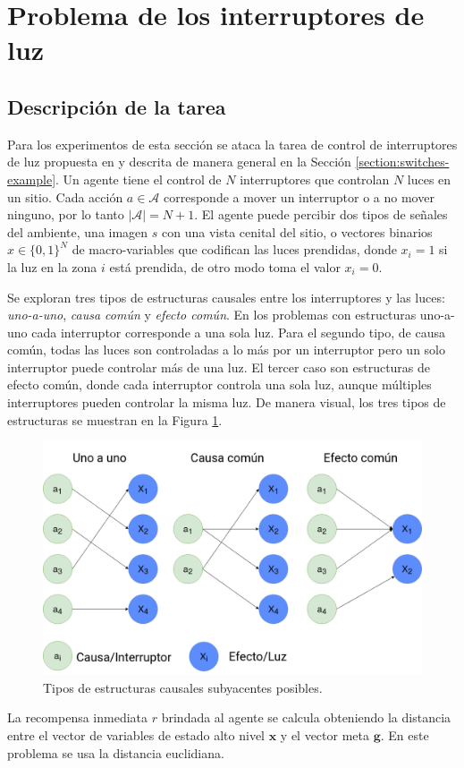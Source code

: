 \section{Problema de los interruptores de luz}

\subsection{Descripción de la tarea}
Para los experimentos de esta sección se ataca la tarea de control de interruptores de luz propuesta en \cite{nair2019causal} y descrita de manera general en la Sección \ref{section:switches-example}. Un agente tiene el control
de $N$ interruptores que controlan $N$ luces en un sitio.
Cada acción $a\in \mathcal{A}$ corresponde a mover un interruptor o 
a no mover ninguno, por lo tanto $|\mathcal{A}| = N + 1$.
El agente puede percibir dos tipos de señales del ambiente,
una imagen $s$ con una vista cenital del sitio, o vectores binarios $x \in \{0,1\}^N$ de 
macro-variables que codifican las luces prendidas, donde
$x_i = 1$ si la luz en la zona $i$ está prendida, de otro modo 
toma el valor $x_i = 0$.

Se exploran tres tipos de estructuras causales entre los
interruptores y las luces: \textit{uno-a-uno},
\textit{causa común} y \textit{efecto común}.
En los problemas con estructuras uno-a-uno cada interruptor corresponde a una sola luz.
Para el segundo tipo, de causa común, todas
las luces son controladas a lo más por un interruptor pero un
solo interruptor puede controlar más de una luz.
El tercer caso son estructuras de efecto común, donde cada interruptor
controla una sola luz, aunque múltiples interruptores
pueden controlar la misma luz. De manera visual, los tres tipos de estructuras
se muestran en la Figura \ref{fig:struct}.

\begin{figure}[H]
    \centering
    \includegraphics[scale=0.3]{Chapter5/Figs/switches_struct.png}
    \caption{Tipos de estructuras causales subyacentes posibles.}
    \label{fig:struct}
\end{figure}
La recompensa inmediata $r$ brindada al agente se calcula obteniendo la distancia entre el vector de variables de estado alto nivel $\mathbf{x}$ y el vector meta $\mathbf{g}$. En este problema se usa la distancia euclidiana.


